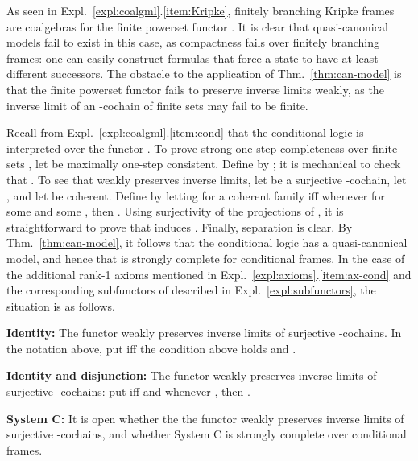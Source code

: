\documentclass[proceedings]{stacs}
\theoremstyle{definition}
\theoremstyle{plain}
\begin{document}
\begin{exa}
As seen in Expl.~\ref{expl:coalgml}.\ref{item:Kripke}, finitely
branching Kripke frames are coalgebras for the finite powerset functor
. It is clear that quasi-canonical models fail to exist
in this case, as compactness fails over finitely branching frames: one
can easily construct formulas  that force a state to have at
least  different successors.  The obstacle to the application of
Thm.~\ref{thm:can-model} is that the finite powerset functor fails to
preserve inverse limits weakly, as the inverse limit of an
-cochain of finite sets may fail to be finite.
\end{exa}

\begin{exa}
  Recall from Expl.~\ref{expl:coalgml}.\ref{item:cond} that the
  conditional logic  is interpreted over the functor
  . To prove strong one-step completeness
  over finite sets , let 
  be maximally one-step consistent. Define  by
  ; it is
  mechanical to check that . To see that  weakly
  preserves inverse limits, let  be a surjective
  -cochain, let , and let 
  be coherent. Define  by letting 
  for a coherent family  iff whenever 
  for some  and some , then . Using
  surjectivity of the projections of , it is straightforward to
  prove that  induces . Finally, separation is clear. By
  Thm.~\ref{thm:can-model}, it follows that the conditional logic
   has a quasi-canonical model, and hence that  is strongly
  complete for conditional frames.  In the case of the additional
  rank-1 axioms mentioned in
  Expl.~\ref{expl:axioms}.\ref{item:ax-cond} and the corresponding
  subfunctors of  described in Expl.~\ref{expl:subfunctors}, the
  situation is as follows.

  \textbf{Identity:} The functor  weakly preserves
  inverse limits of surjective -cochains. In the notation
  above, put  iff the condition above holds and
  .

  \textbf{Identity and disjunction:} The functor
   weakly preserves inverse limits of
  surjective -cochains: put  iff 
  and whenever , then .

  \textbf{System C:} It is open whether the the functor
   weakly preserves inverse
  limits of surjective -cochains, and whether System C is
  strongly complete over conditional frames.


\end{exa}
\end{document}
